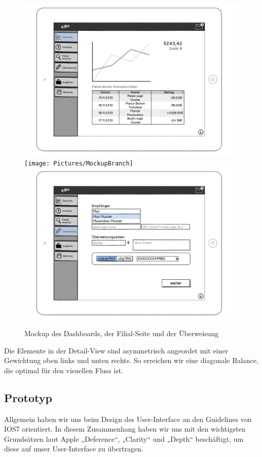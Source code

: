 \begin{figure}[p]
	\centering
	\includegraphics[scale=.52]{Pictures/MockupDashboard}\\
	\texttt{[image: Pictures/MockupBranch]}\\
	\includegraphics[scale=.52]{Pictures/MockupTransition}
	\caption{Mockup des Dashboards, der Filial-Seite und der Überweisung}
\end{figure}

	Die Elemente in der Detail-View sind asymmetrisch angeordet mit einer Gewichtung oben links und unten rechts. So erreichen wir eine diagonale Balance, die optimal für den visuellen Fluss ist.

\subsection{Prototyp}
	Allgemein haben wir uns beim Design des User-Interface an den Guidelines von IOS7 orientiert. In diesem Zusammenhang haben wir uns mit den wichtigsten Grundsätzen laut Apple „Deference“, „Clarity“ und „Depth“ beschäftigt, um diese auf unser User-Interface zu übertragen. 
	
